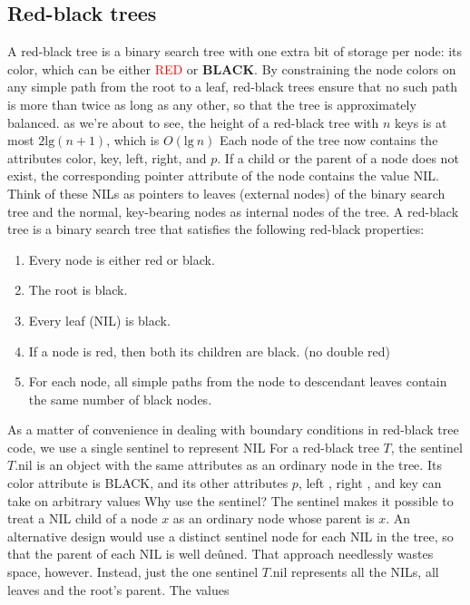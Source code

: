 \documentclass{report}
\begin{document}
\subsection{Red-black trees}
\bigbreak \noindent 
A red-black tree is a binary search tree with one extra bit of storage per node: its
color, which can be either \textcolor{red}{RED} or \textbf{BLACK}. By constraining the node colors on
any simple path from the root to a leaf, red-black trees ensure that no such path is
more than twice as long as any other, so that the tree is approximately balanced.
\bigbreak \noindent 
as we’re about to see, the height of a red-black tree with $n$ keys is at most $2 \text{lg}(n+1) $, which is $O(\text{lg}\ n ) $
\bigbreak \noindent 
Each node of the tree now contains the attributes color, key, left, right, and $p$. If
a child or the parent of a node does not exist, the corresponding pointer attribute of
the node contains the value NIL. Think of these NILs as pointers to leaves (external
nodes) of the binary search tree and the normal, key-bearing nodes as internal nodes
of the tree. 
\bigbreak \noindent 
A red-black tree is a binary search tree that satisfies the following red-black properties:
\begin{enumerate}
    \item Every node is either red or black.
    \item The root is black.
    \item Every leaf (NIL) is black.
    \item If a node is red, then both its children are black. (no double red)
    \item For each node, all simple paths from the node to descendant leaves contain the same number of black nodes.
\end{enumerate}
\bigbreak \noindent 
As a matter of convenience in dealing with boundary conditions in red-black
tree code, we use a single sentinel to represent NIL
For a red-black
tree $T$, the sentinel $T$.nil is an object with the same attributes as an ordinary node
in the tree. Its color attribute is BLACK, and its other attributes $p$, left , right ,
and key can take on arbitrary values
\bigbreak \noindent 
Why use the sentinel? The sentinel makes it possible to treat a NIL child of a
node $x$ as an ordinary node whose parent is $x$. An alternative design would use a
distinct sentinel node for each NIL in the tree, so that the parent of each NIL is well
deûned. That approach needlessly wastes space, however. Instead, just the one
sentinel $T$.nil represents all the NILs, all leaves and the root’s parent. The values
\end{document}
